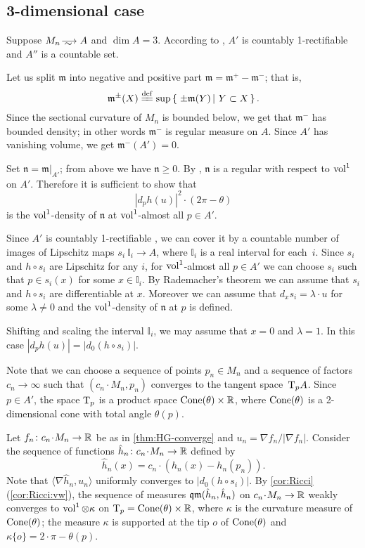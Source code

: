 \subsection{3-dimensional case}


Suppose $M_n\smooths{}A$ and $\dim A=3$.
According to \cite{li-naber}, $A'$ is countably 1-rectifiable and $A''$ is a countable set. 

Let us split $\mathfrak m$ into negative and positive part $\mathfrak m=\mathfrak m^+-\mathfrak m^-$; that is,
\[\mathfrak m^\pm(X)\df\sup\set{\pm\mathfrak m(Y)}{Y\subset X}.\]
Since the sectional curvature of $M_n$ is bounded below, we get that $\mathfrak m^-$ has bounded density; in other words $\mathfrak m^-$ is regular measure on $A$.
Since $A'$ has vanishing volume, we get $\mathfrak m^-(A')=0$.

Set $\mathfrak n=\mathfrak m|_{A'}$; from above we have $\mathfrak n\ge 0$.
By \cite{petrunin-SC}, $\mathfrak n$ is a regular with respect to $\operatorname{vol}^1$ on $A'$.
Therefore it is sufficient to show that 
\[|d_ph(u)|^2\cdot (2\pi-\theta)\]
is the $\operatorname{vol}^1$-density of $\mathfrak n$
at $\operatorname{vol}^1$-almost all $p\in A'$.

Since $A'$ is countably 1-rectifiable \cite{li-naber}, we can cover it by a countable number of images of Lipschitz maps $s_i\:\mathbb{I}_i\to A$, where $\mathbb{I}_i$ is a real interval for each~$i$.
Since $s_i$ and $h\circ s_i$ are Lipschitz for any $i$, for $\operatorname{vol}^1$-almost all $p\in A'$ we can choose $s_i$ such that $p\in s_i(x)$ for some $x\in \mathbb{I}_i$.
By Rademacher's theorem we can assume that $s_i$ and $h\circ s_i$ are differentiable at $x$.
Moreover we can assume that $d_xs_i=\lambda\cdot u$ for some $\lambda\ne 0$ and the $\operatorname{vol}^1$-density of $\mathfrak n$ at $p$ is defined.

Shifting and scaling the interval $\mathbb{I}_i$, we may assume that $x=0$ and $\lambda=1$.
In this case $|d_ph(u)|=|d_0(h\circ s_i)|$.

Note that we can choose a sequence of points $p_n\in M_n$ and a sequence of factors $c_n\to \infty$ such that $(c_n\cdot M_n,p_n)$ converges to the tangent space~$\mathrm{T}_pA$.
Since $p\in A'$, the space $\mathrm{T}_p$ is a product space $\operatorname{Cone}(\theta)\times\mathbb{R}$, where $\operatorname{Cone}(\theta)$ is a 2-dimensional cone with total angle $\theta(p)$.

Let $f_n\:c_n\cdot M_n\to \RR$ be as in \ref{thm:HG-converge} and $u_n=\nabla f_n/|\nabla f_n|$.
Consider the sequence of functions $\hat h_n\:c_n\cdot M_n\to \RR$ defined by 
\[\hat h_n(x)=c_n\cdot(h_n(x)-h_n(p_n)).\]
Note that $\langle\nabla \hat h_n,u_n\rangle$ uniformly converges to  $|d_0(h\circ s_i)|$.
By \ref{cor:Ricci}(\ref{cor:Ricci:vw}), the sequence of measures $\operatorname{\mathfrak{qm}}(\hat h_n, \hat h_n)$ on $c_n\cdot M_n\to \RR$ weakly converges to $\operatorname{vol}^1\otimes\kappa $ on $\T_p\zz=\Cone(\theta)\times\RR$, 
where $\kappa$ is the curvature measure of $\operatorname{Cone}(\theta)$; 
the measure $\kappa$ is supported at the tip $o$ of $\operatorname{Cone}(\theta)$
and $\kappa\{o\}=2\cdot \pi-\theta(p)$.

